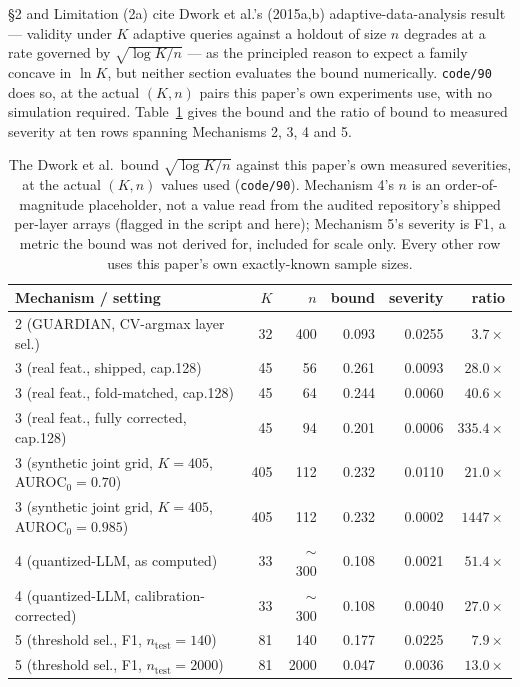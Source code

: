 \documentclass[10pt]{article} %
\begin{document}
\S2 and Limitation (2a) cite Dwork et al.'s (2015a,b) adaptive-data-analysis
result --- validity under $K$ adaptive queries against a holdout of size $n$
degrades at a rate governed by $\sqrt{\log K/n}$ --- as the principled reason
to expect a family concave in $\ln K$, but neither section evaluates the bound
numerically. \texttt{code/90} does so, at the actual $(K,n)$ pairs this
paper's own experiments use, with no simulation required. Table~\ref{tab:ada-bound}
gives the bound and the ratio of bound to measured severity at ten rows
spanning Mechanisms 2, 3, 4 and 5.

\begin{table}[!ht]
\centering
\small
\begin{tabular}{lrrrrr}
\toprule
Mechanism / setting & $K$ & $n$ & bound & severity & ratio \\
\midrule
2 (GUARDIAN, CV-argmax layer sel.) & 32 & 400 & 0.093 & 0.0255 & $3.7\times$ \\
3 (real feat., shipped, cap.128) & 45 & 56 & 0.261 & 0.0093 & $28.0\times$ \\
3 (real feat., fold-matched, cap.128) & 45 & 64 & 0.244 & 0.0060 & $40.6\times$ \\
3 (real feat., fully corrected, cap.128) & 45 & 94 & 0.201 & 0.0006 & $335.4\times$ \\
3 (synthetic joint grid, $K{=}405$, AUROC$_0{=}0.70$) & 405 & 112 & 0.232 & 0.0110 & $21.0\times$ \\
3 (synthetic joint grid, $K{=}405$, AUROC$_0{=}0.985$) & 405 & 112 & 0.232 & 0.0002 & $1447\times$ \\
4 (quantized-LLM, as computed) & 33 & $\sim$300 & 0.108 & 0.0021 & $51.4\times$ \\
4 (quantized-LLM, calibration-corrected) & 33 & $\sim$300 & 0.108 & 0.0040 & $27.0\times$ \\
5 (threshold sel., F1, $n_{\text{test}}{=}140$) & 81 & 140 & 0.177 & 0.0225 & $7.9\times$ \\
5 (threshold sel., F1, $n_{\text{test}}{=}2000$) & 81 & 2000 & 0.047 & 0.0036 & $13.0\times$ \\
\bottomrule
\end{tabular}
\caption{The Dwork et al.\ bound $\sqrt{\log K/n}$ against this paper's own
measured severities, at the actual $(K,n)$ values used (\texttt{code/90}).
Mechanism 4's $n$ is an order-of-magnitude placeholder, not a value read from
the audited repository's shipped per-layer arrays (flagged in the script and
here); Mechanism 5's severity is F1, a metric the bound was not derived for,
included for scale only. Every other row uses this paper's own exactly-known
sample sizes.}
\label{tab:ada-bound}
\end{table}
\end{document}
